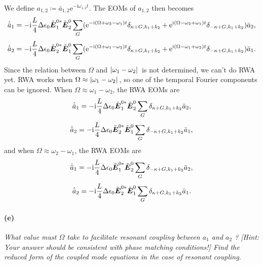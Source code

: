 \documentclass[hyperref, a4paper]{article}
\newcommand*{\ii}{\mathrm{i}}
\newcommand*{\ee}{\mathrm{e}}
\newcommand*{\mvb}[1]{\tilde{\vb*{#1}}}
\begin{document}
We define $a_{1,2} \coloneqq \bar{a}_{1,2} \ee^{- \ii \omega_{1,2} t}$.
The EOMs of $a_{1,2}$ then becomes 
\begin{equation}
    \dot{\bar{a}}_1 = - \ii \frac{L}{4} \Delta \epsilon_0 \mvb{E}_1^{0*} \mvb{E}_2^0 \sum_G (\ee^{- \ii (\Omega + \omega_2 - \omega_1) t} \delta_{\kappa + G, k_1 + k_2} + \ee^{\ii (\Omega - \omega_2 + \omega_1) t} \delta_{-\kappa + G, k_1+k_2}) \bar{a}_2,
\end{equation}
\begin{equation}
    \dot{\bar{a}}_2 = - \ii \frac{L}{4} \Delta \epsilon_0 \mvb{E}_2^{0*} \mvb{E}_1^0 \sum_G (\ee^{- \ii (\Omega + \omega_1 - \omega_2) t} \delta_{\kappa + G, k_1 + k_2} + \ee^{\ii (\Omega - \omega_1 + \omega_2) t} \delta_{-\kappa + G, k_1+k_2}) \bar{a}_1.
\end{equation}
Since the relation between $\Omega$ and $\abs*{\omega_1 - \omega_2}$ is not determined, 
we can't do RWA yet.
RWA works when $\Omega \approx \abs*{\omega_1 - \omega_2}$, 
so one of the temporal Fourier components can be ignored. 
When $\Omega \approx \omega_1 - \omega_2$, the RWA EOMs are 
\begin{equation}
    \dot{\bar{a}}_1 = - \ii \frac{L}{4} \Delta \epsilon_0 \mvb{E}_1^{0*} \mvb{E}_2^0 \sum_G \delta_{\kappa + G, k_1 + k_2} \bar{a}_2, 
\end{equation}
\begin{equation}
    \dot{\bar{a}}_2 = - \ii \frac{L}{4} \Delta \epsilon_0 \mvb{E}_2^{0*} \mvb{E}_1^0 \sum_G \delta_{-\kappa + G, k_1 + k_2} \bar{a}_1,
\end{equation}
and when $\Omega \approx \omega_2 - \omega_1$, the RWA EOMs are 
\begin{equation}
    \dot{\bar{a}}_1 = - \ii \frac{L}{4} \Delta \epsilon_0 \mvb{E}_1^{0*} \mvb{E}_2^0 \sum_G \delta_{-\kappa + G, k_1 + k_2} \bar{a}_2, 
\end{equation}
\begin{equation}
    \dot{\bar{a}}_2 = - \ii \frac{L}{4} \Delta \epsilon_0 \mvb{E}_2^{0*} \mvb{E}_1^0 \sum_G \delta_{ \kappa + G, k_1 + k_2} \bar{a}_1.
\end{equation}

\paragraph*{(e)} \textit{What value must $\Omega$ take to facilitate resonant coupling between $a_1$ and $a_2$ ? [Hint: Your answer should be consistent with phase matching conditions!] Find the reduced form of the coupled mode equations in the case of resonant coupling.} 
\end{document}

